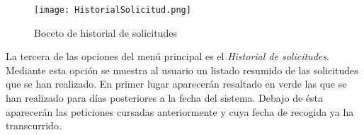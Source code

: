   \begin{figure}[H]
\centering
	\texttt{[image: HistorialSolicitud.png]} 
\caption{Boceto de historial de solicitudes}
\end{figure}
La tercera de las opciones del menú principal es el \textit{Historial de solicitudes}. Mediante esta opción se muestra al usuario un listado resumido de las solicitudes que se han realizado. En primer lugar aparecerán resaltado en verde las que se han realizado para días posteriores a la fecha del sistema. Debajo de ésta aparecerán las peticiones cursadas anteriormente y cuya fecha de recogida ya ha transcurrido. \\

